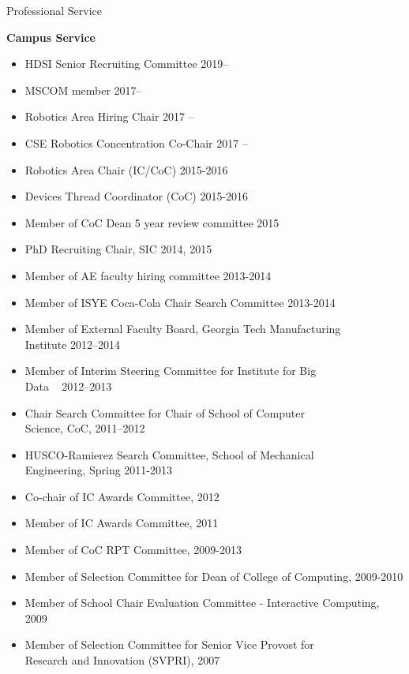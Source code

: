 \documentclass{article}
\begin{document}
\begin{cv}
\begin{cvlist}{Professional Service}
\item {\bf Campus Service}
  \begin{itemize}
  \item HDSI Senior Recruiting Committee  \cftdotfill{\cftdotsep} 2019--
  \item MSCOM member \cftdotfill{\cftdotsep} 2017--
  \item Robotics Area Hiring Chair \cftdotfill{\cftdotsep} 2017 --
  \item CSE Robotics Concentration Co-Chair \cftdotfill{\cftdotsep}
    2017 --
  \item Robotics Area Chair (IC/CoC) \cftdotfill{\cftdotsep} 2015-2016
  \item Devices Thread Coordinator (CoC) \cftdotfill{\cftdotsep} 2015-2016
  \item Member of CoC Dean 5 year review committee
    \cftdotfill{\cftdotsep} 2015
  \item PhD Recruiting Chair, SIC \cftdotfill{\cftdotsep} 2014, 2015
  \item Member of AE faculty hiring committee \cftdotfill{\cftdotsep}
    2013-2014
  \item Member of ISYE Coca-Cola Chair Search Committee
    \cftdotfill{\cftdotsep} 2013-2014
  \item Member of External Faculty Board, Georgia Tech Manufacturing\\
    Institute \cftdotfill{\cftdotsep} 2012--2014
  \item Member of Interim Steering Committee for Institute for Big
    \\Data ~ \cftdotfill{\cftdotsep} 2012--2013
  \item Chair Search Committee for Chair of School of Computer\\
    Science, CoC, \cftdotfill{\cftdotsep} 2011--2012
  \item HUSCO-Ramierez Search Committee, School of Mechanical\\
    Engineering, Spring \cftdotfill{\cftdotsep} 2011-2013
  \item Co-chair of IC Awards Committee, \cftdotfill{\cftdotsep} 2012
  \item Member of IC Awards Committee, \cftdotfill{\cftdotsep} 2011
  \item Member of CoC RPT Committee, \cftdotfill{\cftdotsep} 2009-2013
  \item Member of Selection Committee for Dean of College of
    Computing, \cftdotfill{\cftdotsep} 2009-2010
  \item Member of School Chair Evaluation Committee - Interactive
    Computing, \cftdotfill{\cftdotsep} 2009
  \item Member of Selection Committee for Senior Vice Provost for \\
    Research and Innovation (SVPRI), \cftdotfill{\cftdotsep} 2007
  \end{itemize}


\end{cvlist}
\end{cv}
\end{document}
